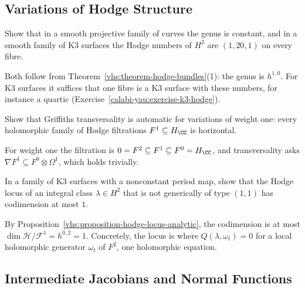 \subsection{Variations of Hodge Structure}\label{vhs:subsection-exercises-variations-of-hodge-structure}

\begin{exercise}\label{vhs:exercise-constant-hodge-numbers}
Show that in a smooth projective family of curves the genus is constant, and in a smooth family of K3 surfaces the Hodge numbers of $H^2$ are $(1, 20, 1)$ on every fibre.
\end{exercise}

\begin{solution}
Both follow from Theorem~\ref{vhs:theorem-hodge-bundles}(1): the genus is $h^{1,0}$. For K3 surfaces it suffices that one fibre is a K3 surface with these numbers, for instance a quartic
(Exercise~\ref{calabi-yau:exercise-k3-hodge}).
\end{solution}

\begin{exercise}\label{vhs:exercise-transversality-weight-one}
Show that Griffiths transversality is automatic for variations of weight one: every holomorphic family of Hodge filtrations $F^1 \subseteq H_\CC$ is horizontal.
\end{exercise}

\begin{solution}
For weight one the filtration is $0 = F^2 \subseteq F^1 \subseteq F^0 = H_\CC$, and transversality asks $\nabla F^1 \subseteq F^0 \otimes \Omega^1$, which holds trivially.
\end{solution}

\begin{exercise}\label{vhs:exercise-hodge-locus-codimension}
In a family of K3 surfaces with a nonconstant period map, show that the Hodge locus of an integral class $\lambda \in H^2$ that is not generically of type $(1,1)$ has codimension at most $1$.
\end{exercise}

\begin{solution}
By Proposition~\ref{vhs:proposition-hodge-locus-analytic}, the codimension is at most $\dim\mathcal{H}/\mathcal{F}^1 = h^{0,2} = 1$. Concretely, the locus is where $Q(\lambda, \omega_t) = 0$ for a local
holomorphic generator $\omega_t$ of $F^2$, one holomorphic equation.
\end{solution}

\subsection{Intermediate Jacobians and Normal Functions}\label{vhs:subsection-exercises-intermediate-jacobians}

